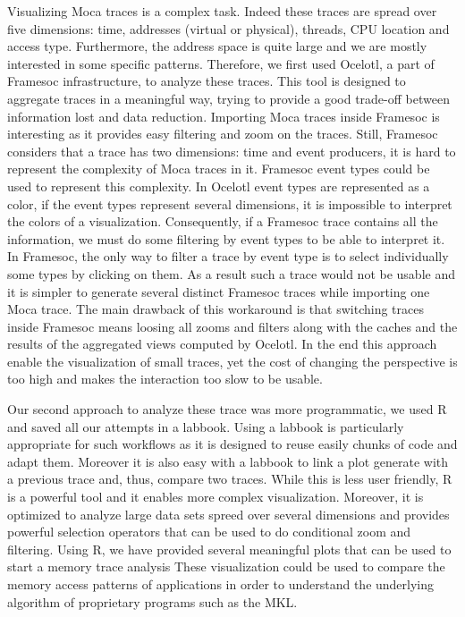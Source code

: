 Visualizing \gls{Moca} traces is a complex task.
Indeed these traces are spread over five dimensions: time, addresses (virtual or physical), threads, \gls{CPU} location and access type.
Furthermore, the address space is quite large and we are mostly interested in some specific patterns.
Therefore, we first used \gls{Ocelotl}, a part of \gls{Framesoc} infrastructure, to analyze these traces.
This tool is designed to aggregate traces in a meaningful way, trying to provide a good trade-off between information lost and data reduction.
Importing \gls{Moca} traces inside \gls{Framesoc} is interesting as it provides easy filtering and zoom on the traces.
Still, \gls{Framesoc} considers that a trace has two dimensions: time and event producers, it is hard to represent the complexity of \gls{Moca} traces in it.
\gls{Framesoc} event types could be used to represent this complexity.
In \gls{Ocelotl} event types are represented as a color, if the event types represent several dimensions, it is impossible to interpret the colors of a visualization.
Consequently, if a \gls{Framesoc} trace contains all the information, we must do some filtering by event types to be able to interpret it.
In \gls{Framesoc}, the only way to filter a trace by event type is to select individually some types by clicking on them.
As a result such a trace would not be usable and it is simpler to generate several distinct \gls{Framesoc} traces while importing one \gls{Moca} trace.
The main drawback of this workaround is that switching traces inside \gls{Framesoc} means loosing all zooms and filters along with the caches and the results of the aggregated views computed by \gls{Ocelotl}.
In the end this approach enable the visualization of small traces, yet the cost of changing the perspective is too high and makes the interaction too slow to be usable.

Our second approach to analyze these trace was more programmatic, we used \gls{R} and saved all our attempts in a labbook.
Using a labbook is particularly appropriate for such workflows as it is designed to reuse easily chunks of code and adapt them.
Moreover it is also easy with a labbook to link a plot generate with a previous trace and, thus, compare two traces.
While this is less user friendly, \gls{R} is a powerful tool and it enables more complex visualization.
Moreover, it is optimized to analyze large data sets spreed over several dimensions and provides powerful selection operators that can be used to do conditional zoom and filtering.
Using \gls{R}, we have provided several meaningful plots that can be used to start a memory trace analysis
These visualization could be used to compare the memory access patterns of applications in order to understand the underlying algorithm of proprietary programs such as the \gls{MKL}.

